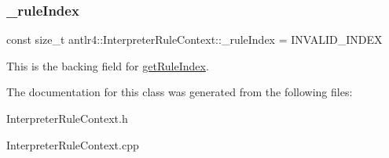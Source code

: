 \subsubsection{\texorpdfstring{\+\_\+rule\+Index}{\_ruleIndex}}
{\footnotesize\ttfamily const size\+\_\+t antlr4\+::\+Interpreter\+Rule\+Context\+::\+\_\+rule\+Index = I\+N\+V\+A\+L\+I\+D\+\_\+\+I\+N\+D\+EX\hspace{0.3cm}{\ttfamily [protected]}}

This is the backing field for \hyperlink{}{get\+Rule\+Index}. 

The documentation for this class was generated from the following files\+:\begin{DoxyCompactItemize}
\item 
Interpreter\+Rule\+Context.\+h\item 
Interpreter\+Rule\+Context.\+cpp\end{DoxyCompactItemize}
